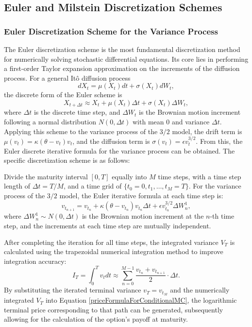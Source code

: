 \subsection{Euler and Milstein Discretization Schemes}
\subsubsection{Euler Discretization Scheme for the Variance Process}
The Euler discretization scheme is the most fundamental discretization method for numerically solving stochastic differential equations. Its core lies in performing a first-order Taylor expansion approximation on the increments of the diffusion process. For a general Itô diffusion process
$$dX_t = \mu(X_t)dt + \sigma(X_t)dW_t,$$
the discrete form of the Euler scheme is
$$X_{t+\Delta t} \approx X_t + \mu(X_t)\Delta t + \sigma(X_t)\Delta W_t,$$
where $\Delta t$ is the discrete time step, and $\Delta W_t$ is the Brownian motion increment following a normal distribution $N(0,\Delta t)$ with mean $0$ and variance $\Delta t$. Applying this scheme to the variance process of the $3/2$ model, the drift term is $\mu(v_t) = \kappa(\theta-v_t)v_t$, and the diffusion term is $\sigma(v_t) = \epsilon v_t^{3/2}$. From this, the Euler discrete iterative formula for the variance process can be obtained. The specific discretization scheme is as follows:

Divide the maturity interval $[0,T]$ equally into $M$ time steps, with a time step length of $\Delta t = T/M$, and a time grid of $\{t_0=0,t_1,\ldots,t_M=T\}$. For the variance process of the $3/2$ model, the Euler iterative formula at each time step is:
\begin{equation}
  v_{t_{n+1}} = v_{t_n} + \kappa(\theta - v_{t_n})v_{t_n}\Delta t + \epsilon v_{t_n}^{3/2}\Delta W_n^1,
  \label{euler_v}
\end{equation}
where $\Delta W_n^1 \sim N(0,\Delta t)$ is the Brownian motion increment at the $n$-th time step, and the increments at each time step are mutually independent.

After completing the iteration for all time steps, the integrated variance $V_T$ is calculated using the trapezoidal numerical integration method to improve integration accuracy:
\begin{equation}
  I_T = \int_0^T v_t dt \approx \sum_{n=0}^{M-1} \frac{v_{t_n} + v_{t_{n+1}}}{2} \cdot \Delta t.
  \label{trapezoidal_I}
\end{equation}
By substituting the iterated terminal variance $v_T = v_{t_M}$ and the numerically integrated $V_T$ into Equation \eqref{priceFormulaForConditionalMC}, the logarithmic terminal price corresponding to that path can be generated, subsequently allowing for the calculation of the option's payoff at maturity.


